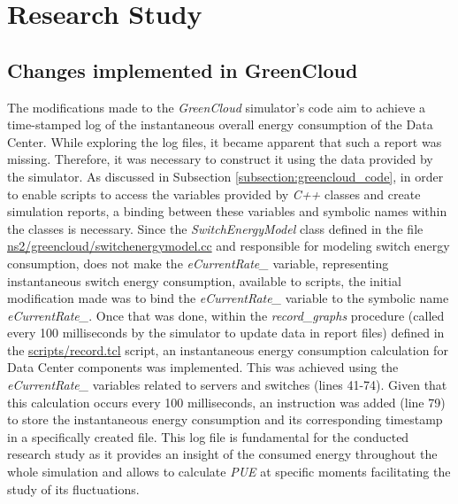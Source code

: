\chapter{Research Study} \label{chapter:research_study}

\begin{citazione}

\end{citazione}
\newpage

\section{Changes implemented in GreenCloud}\label{section:greencloud_mod}
The modifications made to the \emph{GreenCloud} simulator's code aim to achieve a time-stamped log of the instantaneous overall energy consumption of the Data Center. While exploring the log files, it became apparent that such a report was missing. Therefore, it was necessary to construct it using the data provided by the simulator. As discussed in Subsection \ref{subsection:greencloud_code}, in order to enable scripts to access the variables provided by \emph{C++} classes and create simulation reports, a binding between these variables and symbolic names within the classes is necessary. Since the \emph{SwitchEnergyModel} class defined in the file \href{https://github.com/vincenzo-emanuele/masters-degree-thesis/blob/main/greencloud_modified_src/ns2/greencloud/switchenergymodel.cc}{ns2/greencloud/switchenergymodel.cc} and responsible for modeling switch energy consumption, does not make the \emph{eCurrentRate\_} variable, representing instantaneous switch energy consumption, available to scripts, the initial modification made was to bind the \emph{eCurrentRate\_} variable to the symbolic name \emph{eCurrentRate\_}. Once that was done, within the \emph{record\_graphs} procedure (called every 100 milliseconds by the simulator to update data in report files) defined in the \href{https://github.com/vincenzo-emanuele/masters-degree-thesis/blob/main/greencloud\_modified\_src/scripts/record.tcl}{scripts/record.tcl} script, an instantaneous energy consumption calculation for Data Center components was implemented. This was achieved using the \emph{eCurrentRate\_} variables related to servers and switches (lines 41-74). Given that this calculation occurs every 100 milliseconds, an instruction was added (line 79) to store the instantaneous energy consumption and its corresponding timestamp in a specifically created file. This log file is fundamental for the conducted research study as it provides an insight of the consumed energy throughout the whole simulation and allows to calculate \emph{PUE} at specific moments facilitating the study of its fluctuations.

